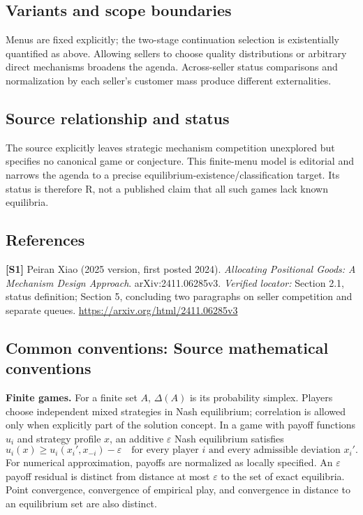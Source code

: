 \documentclass[11pt,a4paper]{article}
\begin{document}
\subsection*{Variants and scope boundaries}
Menus are fixed explicitly; the two-stage continuation selection is existentially quantified as above. Allowing sellers to choose quality distributions or arbitrary direct mechanisms broadens the agenda. Across-seller status comparisons and normalization by each seller's customer mass produce different externalities.
\subsection*{Source relationship and status}
The source explicitly leaves strategic mechanism competition unexplored but specifies no canonical game or conjecture. This finite-menu model is editorial and narrows the agenda to a precise equilibrium-existence/classification target. Its status is therefore R, not a published claim that all such games lack known equilibria.
\subsection*{References}
\begingroup\footnotesize\raggedright
\textbf{[S1]} Peiran Xiao (2025 version, first posted 2024). \emph{Allocating Positional Goods: A Mechanism Design Approach}. arXiv:2411.06285v3. \textit{Verified locator:} Section 2.1, status definition; Section 5, concluding two paragraphs on seller competition and separate queues. \url{https://arxiv.org/html/2411.06285v3}
\par\endgroup

\subsection*{Common conventions: Source mathematical conventions}

\textbf{Finite games.} For a finite set $A$, $\Delta(A)$ is its probability
simplex. Players choose independent mixed strategies in Nash equilibrium;
correlation is allowed only when explicitly part of the solution concept.
In a game with payoff functions $u_i$ and strategy profile $x$, an additive
$\varepsilon$ Nash equilibrium satisfies
\[
 u_i(x)\geq u_i(x_i',x_{-i})-\varepsilon
 \quad\text{for every player $i$ and every admissible deviation $x_i'$}.
\]
For numerical approximation, payoffs are normalized as locally specified.
An $\varepsilon$ payoff residual is distinct from distance at most
$\varepsilon$ to the set of exact equilibria. Point convergence, convergence
of empirical play, and convergence in distance to an equilibrium set are
also distinct.
\end{document}
